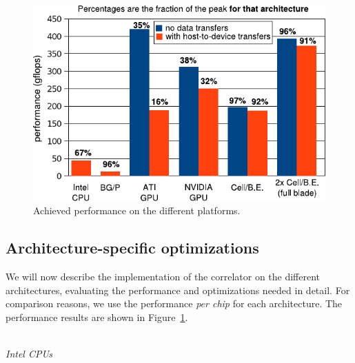 \documentclass{article}
\begin{document}
\begin{figure}[t]
\begin{center}
\includegraphics[width=\columnwidth]{figures/performance-graph-v2.pdf} %
\end{center}
\vspace{-0.5cm}
\caption{Achieved performance on the different platforms.}
\label{performance-graph}
\end{figure}



\subsection{Architecture-specific optimizations}
\label{sec:architecture-optimizations}

We will now describe the implementation of the correlator on
the different architectures, evaluating the performance and optimizations needed in detail. 
For comparison reasons, we use the performance
\emph{per chip} for each architecture.
The performance results are shown in Figure~\ref{performance-graph}.


\noindent \\ \emph{Intel CPUs}
\end{document}
